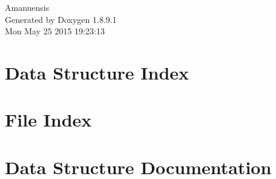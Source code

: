 \documentclass[twoside]{book}
\newcommand{\+}{\discretionary{\mbox{\scriptsize$\hookleftarrow$}}{}{}}
\newcommand{\clearemptydoublepage}{%
  \newpage{\pagestyle{empty}\cleardoublepage}%
}
\begin{document}
\hypersetup{pageanchor=false,
             bookmarks=true,
             bookmarksnumbered=true,
             pdfencoding=unicode
            }
\begin{titlepage}
\vspace*{7cm}
\begin{center}%
{\Large Amanuensis }\\
\vspace*{1cm}
{\large Generated by Doxygen 1.8.9.1}\\
\vspace*{0.5cm}
{\small Mon May 25 2015 19:23:13}\\
\end{center}
\end{titlepage}
\clearemptydoublepage
\tableofcontents
\clearemptydoublepage
{}
\hypersetup{pageanchor=true}

\chapter{Data Structure Index}

\chapter{File Index}

\chapter{Data Structure Documentation}















































\end{document}
